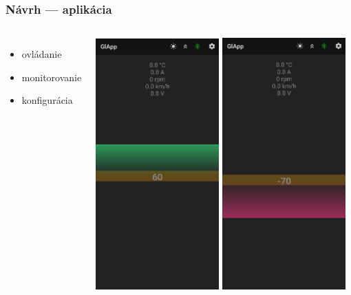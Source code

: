   \begin{frame}
    \frametitle{Návrh --- aplikácia}
    \begin{columns}
      \begin{itemize}
        \item ovládanie
        \item monitorovanie
        \item konfigurácia
      \end{itemize}

      \includegraphics[width=0.48\textwidth]{figures/app-drivet.png}
      \includegraphics[width=0.48\textwidth]{figures/app-driveb.png}
    \end{columns}
  \end{frame}
  
